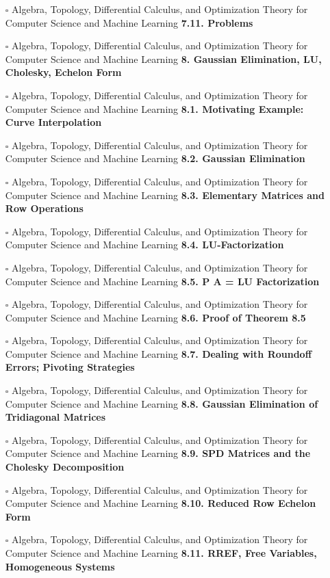 \documentclass[a4, landscape, 12pt]{article}
\newcommand{\checkbox}{$\square$}%
\begin{document}
\begin{itemize}
{}
\item [\checkbox]  Algebra, Topology, Differential Calculus, and Optimization Theory for Computer Science and Machine Learning \textbf{ 7.11. Problems
}
\item [\checkbox]  Algebra, Topology, Differential Calculus, and Optimization Theory for Computer Science and Machine Learning \textbf{ 8. Gaussian Elimination, LU, Cholesky, Echelon Form
}
\item [\checkbox]  Algebra, Topology, Differential Calculus, and Optimization Theory for Computer Science and Machine Learning \textbf{ 8.1. Motivating Example: Curve Interpolation
}
\item [\checkbox]  Algebra, Topology, Differential Calculus, and Optimization Theory for Computer Science and Machine Learning \textbf{ 8.2. Gaussian Elimination
}
\item [\checkbox]  Algebra, Topology, Differential Calculus, and Optimization Theory for Computer Science and Machine Learning \textbf{ 8.3. Elementary Matrices and Row Operations
}
\item [\checkbox]  Algebra, Topology, Differential Calculus, and Optimization Theory for Computer Science and Machine Learning \textbf{ 8.4. LU-Factorization
}
\item [\checkbox]  Algebra, Topology, Differential Calculus, and Optimization Theory for Computer Science and Machine Learning \textbf{ 8.5. P A = LU Factorization
}
\item [\checkbox]  Algebra, Topology, Differential Calculus, and Optimization Theory for Computer Science and Machine Learning \textbf{ 8.6. Proof of Theorem 8.5
}
\item [\checkbox]  Algebra, Topology, Differential Calculus, and Optimization Theory for Computer Science and Machine Learning \textbf{ 8.7. Dealing with Roundoff Errors; Pivoting Strategies
}
\item [\checkbox]  Algebra, Topology, Differential Calculus, and Optimization Theory for Computer Science and Machine Learning \textbf{ 8.8. Gaussian Elimination of Tridiagonal Matrices
}
\item [\checkbox]  Algebra, Topology, Differential Calculus, and Optimization Theory for Computer Science and Machine Learning \textbf{ 8.9. SPD Matrices and the Cholesky Decomposition
}
\item [\checkbox]  Algebra, Topology, Differential Calculus, and Optimization Theory for Computer Science and Machine Learning \textbf{ 8.10. Reduced Row Echelon Form
}
\item [\checkbox]  Algebra, Topology, Differential Calculus, and Optimization Theory for Computer Science and Machine Learning \textbf{ 8.11. RREF, Free Variables, Homogeneous Systems
}
\end{itemize}
\end{document}
